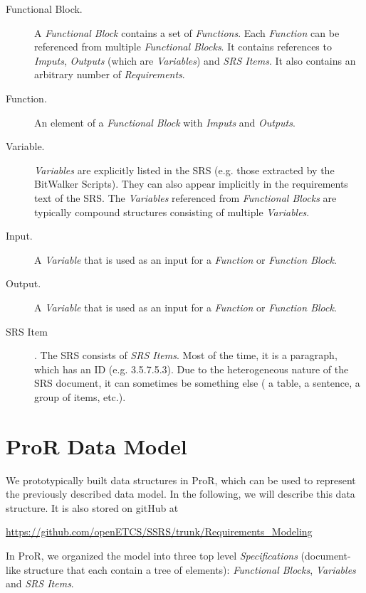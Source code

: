 \documentclass{template/openetcs_article}
\begin{document}
\begin{description}

\item[Functional Block.] A \emph{Functional Block} contains a set of \emph{Functions}.  Each \emph{Function} can be referenced from multiple \emph{Functional Blocks}.  It contains references to \emph{Imputs}, \emph{Outputs} (which are \emph{Variables}) and \emph{SRS Items}.  It also contains an arbitrary number of \emph{Requirements}.

\item[Function.] An element of a \emph{Functional Block} with \emph{Imputs} and \emph{Outputs}.

\item[Variable.] \emph{Variables} are explicitly listed in the SRS (e.g. those extracted by the BitWalker Scripts).  They can also appear implicitly in the requirements text of the SRS.  The \emph{Variables} referenced from \emph{Functional Blocks} are typically compound structures consisting of multiple \emph{Variables}.

\item[Input.] A \emph{Variable} that is used as an input for a \emph{Function} or \emph{Function Block}.

\item[Output.] A \emph{Variable} that is used as an input for a \emph{Function} or \emph{Function Block}.

\item[SRS Item].  The SRS consists of \emph{SRS Items}.  Most of the time, it is a paragraph, which has an ID (e.g. 3.5.7.5.3).  Due to the heterogeneous nature of the SRS document, it can sometimes be something else ( a table, a sentence, a group of items, etc.).

\end{description}

\section{ProR Data Model}

We prototypically built data structures in ProR, which can be used to represent the previously described data model.  In the following, we will describe this data structure.  It is also stored on gitHub at

\url{https://github.com/openETCS/SSRS/trunk/Requirements_Modeling}

In ProR, we organized the model into three top level \emph{Specifications} (document-like structure that each contain a tree of elements): \emph{Functional Blocks}, \emph{Variables} and \emph{SRS Items}.
\end{document}
